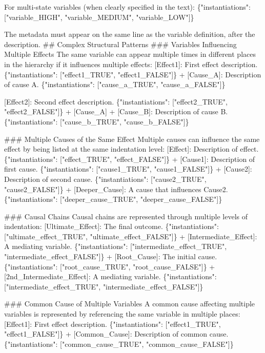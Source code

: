 \documentclass[
  11pt,
  letterpaper,
  openany]{book}
\newenvironment{Shaded}{\begin{snugshade}}{\end{snugshade}}
\newcommand{\StringTok}[1]{\textcolor[rgb]{0.13,0.47,0.30}{#1}}
\begin{document}
\begin{landscape}
\begin{Shaded}
\begin{Highlighting}[]
\StringTok{For multi{-}state variables (when clearly specified in the text):}
\StringTok{\{"instantiations": ["variable\_HIGH", "variable\_MEDIUM", "variable\_LOW"]\}}

\StringTok{The metadata must appear on the same line as the variable definition, after the description.}
\StringTok{\#\# Complex Structural Patterns}
\StringTok{\#\#\# Variables Influencing Multiple Effects}
\StringTok{The same variable can appear multiple times in different places in the hierarchy if it influences multiple effects:}
\StringTok{[Effect1]: First effect description. \{"instantiations": ["effect1\_TRUE", "effect1\_FALSE"]\}}
\StringTok{  + [Cause\_A]: Description of cause A. \{"instantiations": ["cause\_a\_TRUE", "cause\_a\_FALSE"]\}}

\StringTok{[Effect2]: Second effect description. \{"instantiations": ["effect2\_TRUE", "effect2\_FALSE"]\}}
\StringTok{  + [Cause\_A]}
\StringTok{  + [Cause\_B]: Description of cause B. \{"instantiations": ["cause\_b\_TRUE", "cause\_b\_FALSE"]\}}

\StringTok{\#\#\# Multiple Causes of the Same Effect}
\StringTok{Multiple causes can influence the same effect by being listed at the same indentation level:}
\StringTok{[Effect]: Description of effect. \{"instantiations": ["effect\_TRUE", "effect\_FALSE"]\}}
\StringTok{  + [Cause1]: Description of first cause. \{"instantiations": ["cause1\_TRUE", "cause1\_FALSE"]\}}
\StringTok{  + [Cause2]: Description of second cause. \{"instantiations": ["cause2\_TRUE", "cause2\_FALSE"]\}}
\StringTok{    + [Deeper\_Cause]: A cause that influences Cause2. \{"instantiations": ["deeper\_cause\_TRUE", "deeper\_cause\_FALSE"]\}}

\StringTok{\#\#\# Causal Chains}
\StringTok{Causal chains are represented through multiple levels of indentation:}
\StringTok{[Ultimate\_Effect]: The final outcome. \{"instantiations": ["ultimate\_effect\_TRUE", "ultimate\_effect\_FALSE"]\}}
\StringTok{  + [Intermediate\_Effect]: A mediating variable. \{"instantiations": ["intermediate\_effect\_TRUE", "intermediate\_effect\_FALSE"]\}}
\StringTok{    + [Root\_Cause]: The initial cause. \{"instantiations": ["root\_cause\_TRUE", "root\_cause\_FALSE"]\}}
\StringTok{  + [2nd\_Intermediate\_Effect]: A mediating variable. \{"instantiations": ["intermediate\_effect\_TRUE", "intermediate\_effect\_FALSE"]\}}


\StringTok{\#\#\# Common Cause of Multiple Variables}
\StringTok{A common cause affecting multiple variables is represented by referencing the same variable in multiple places:}
\StringTok{[Effect1]: First effect description. \{"instantiations": ["effect1\_TRUE", "effect1\_FALSE"]\}}
\StringTok{  + [Common\_Cause]: Description of common cause. \{"instantiations": ["common\_cause\_TRUE", "common\_cause\_FALSE"]\}}


\end{Highlighting}
\end{Shaded}
\end{landscape}
\end{document}

